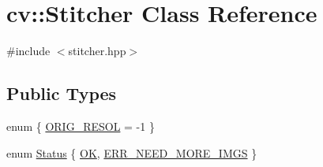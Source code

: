 \hypertarget{classcv_1_1Stitcher}{\section{cv\-:\-:Stitcher Class Reference}
\label{classcv_1_1Stitcher}
}


{\ttfamily \#include $<$stitcher.\-hpp$>$}

\subsection*{Public Types}
\begin{DoxyCompactItemize}
\item 
enum \{ \hyperlink{classcv_1_1Stitcher_a0cc01cd199e4ca1b96c6ba0d2c7137ffac77eedc34a400551e89e12818f8bec63}{O\-R\-I\-G\-\_\-\-R\-E\-S\-O\-L} = -\/1
 \}
\item 
enum \hyperlink{classcv_1_1Stitcher_a507409ce9435dd89857469d12ec06b45}{Status} \{ \hyperlink{classcv_1_1Stitcher_a507409ce9435dd89857469d12ec06b45afc04343b65c6780b62b684ed14e26586}{O\-K}, 
\hyperlink{classcv_1_1Stitcher_a507409ce9435dd89857469d12ec06b45a2d8d41bde739520bdc0a75af8c869bbe}{E\-R\-R\-\_\-\-N\-E\-E\-D\-\_\-\-M\-O\-R\-E\-\_\-\-I\-M\-G\-S}
 \}
\end{DoxyCompactItemize}
